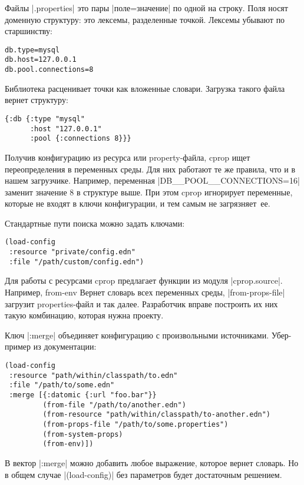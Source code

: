 Файлы \spverb|.properties| это пары \spverb|поле=значение| по одной на строку. Поля носят
доменную структуру: это лексемы, разделенные точкой. Лексемы убывают по
старшинству:

\begin{verbatim}
db.type=mysql
db.host=127.0.0.1
db.pool.connections=8
\end{verbatim}

Библиотека расценивает точки как вложенные словари. Загрузка такого файла вернет
структуру:

\begin{verbatim}
{:db {:type "mysql"
      :host "127.0.0.1"
      :pool {:connections 8}}}
\end{verbatim}

Получив конфигурацию из ресурса или property-файла, cprop ищет переопределения в
переменных среды. Для них работают те же правила, что и в нашем
загрузчике. Например, переменная \spverb|DB__POOL__CONNECTIONS=16| заменит
значение 8 в структуре выше. При этом cprop игнорирует переменные, которые не
входят в ключи конфигурации, и тем самым не загрязняет~ее.

Стандартные пути поиска можно задать ключами:

\begin{verbatim}
(load-config
 :resource "private/config.edn"
 :file "/path/custom/config.edn")
\end{verbatim}

Для работы с ресурсами cprop предлагает функции из модуля
\spverb|cprop.source|. Например, from-env Вернет словарь всех переменных среды,
\spverb|from-props-file| загрузит properties-файл и так далее. Разработчик вправе
построить их них такую комбинацию, которая нужна проекту.

Ключ \spverb|:merge| объединяет конфигурацию с произвольными источниками. Убер-пример
из документации:

\begin{verbatim}
(load-config
 :resource "path/within/classpath/to.edn"
 :file "/path/to/some.edn"
 :merge [{:datomic {:url "foo.bar"}}
         (from-file "/path/to/another.edn")
         (from-resource "path/within/classpath/to-another.edn")
         (from-props-file "/path/to/some.properties")
         (from-system-props)
         (from-env)])
\end{verbatim}

В вектор \spverb|:merge| можно добавить любое выражение, которое вернет словарь. Но в
общем случае \spverb|(load-config)| без параметров будет достаточным решением.

